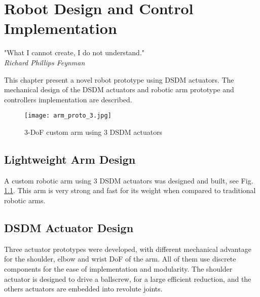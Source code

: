\chapter{Robot Design and Control Implementation}
\label{sec:ExperimentalValidation}

\begin{flushright}
"What I cannot create, I do not understand." \\ \emph{Richard Phillips Feynman}
\end{flushright}
\vspace{10pt}



This chapter present a novel robot prototype using DSDM actuators. The mechanical design of the DSDM actuators and robotic arm prototype and controllers implementation are described.

\begin{figure}[htp]
	\centering
		\texttt{[image: arm\_proto\_3.jpg]}
	\caption{3-DoF custom arm using 3 DSDM actuators}
	\label{fig:dsdm_arm}
\end{figure}


\section{Lightweight Arm Design}
\label{sec:DSDMArm}

A custom robotic arm using 3 DSDM actuators was designed and built, see Fig. \ref{fig:dsdm_arm}. This arm is very strong and fast for its weight when compared to traditional robotic arms. 

\section{DSDM Actuator Design}
\label{sec:ActuatorDesign}

Three actuator prototypes were developed, with different mechanical advantage for the shoulder, elbow and wrist DoF of the arm. All of them use discrete components for the ease of implementation and modularity. The shoulder actuator is designed to drive a ballscrew, for a large efficient reduction, and the others actuators are embedded into revolute joints. 

